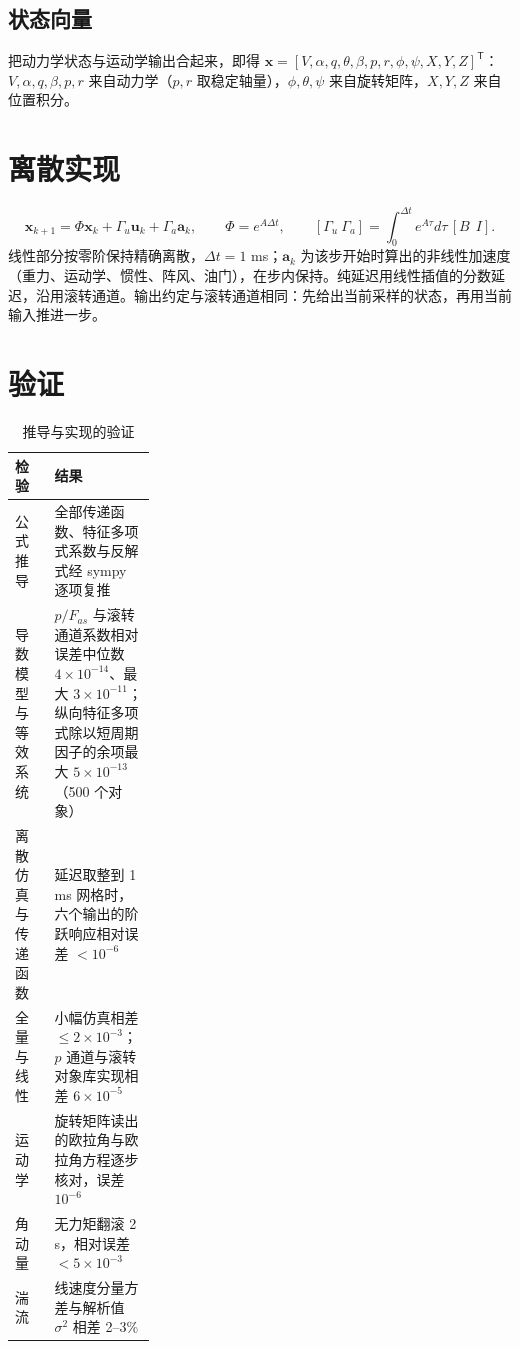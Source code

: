 \documentclass[UTF8,a4paper,11pt,fontset=fandol,scheme=plain]{ctexart}
\begin{document}
\subsection{状态向量}
把动力学状态与运动学输出合起来，即得 \(\mathbf x=[V,\alpha,q,\theta,\beta,p,r,\phi,\psi,X,Y,Z]^{\mathsf T}\)：\(V,\alpha,q,\beta,p,r\) 来自动力学（\(p,r\) 取稳定轴量），\(\phi,\theta,\psi\) 来自旋转矩阵，\(X,Y,Z\) 来自位置积分。

\section{离散实现}
\begin{equation}
\mathbf x_{k+1}=\Phi\mathbf x_k+\Gamma_u\mathbf u_k+\Gamma_a\mathbf a_k,\qquad \Phi=e^{A\Delta t},\qquad [\Gamma_u\ \Gamma_a]=\int_0^{\Delta t}e^{A\tau}d\tau\,[B\ \ I].
\end{equation}
线性部分按零阶保持精确离散，\(\Delta t=1\) ms；\(\mathbf a_k\) 为该步开始时算出的非线性加速度（重力、运动学、惯性、阵风、油门），在步内保持。纯延迟用线性插值的分数延迟，沿用滚转通道。输出约定与滚转通道相同：先给出当前采样的状态，再用当前输入推进一步。

\section{验证}
\begin{table}[H]
\centering\small
\caption{推导与实现的验证}\label{tab:check}
\begin{tabularx}{\linewidth}{@{}>{\raggedright\arraybackslash}p{0.28\linewidth}Y@{}}
\toprule
检验 & 结果 \\
\midrule
公式推导 & 全部传递函数、特征多项式系数与反解式经 sympy 逐项复推 \\
导数模型与等效系统 & \(p/F_{as}\) 与滚转通道系数相对误差中位数 \(4\times10^{-14}\)、最大 \(3\times10^{-11}\)；纵向特征多项式除以短周期因子的余项最大 \(5\times10^{-13}\)（500 个对象） \\
离散仿真与传递函数 & 延迟取整到 1 ms 网格时，六个输出的阶跃响应相对误差 \(<10^{-6}\) \\
全量与线性 & 小幅仿真相差 \(\le2\times10^{-3}\)；\(p\) 通道与滚转对象库实现相差 \(6\times10^{-5}\) \\
运动学 & 旋转矩阵读出的欧拉角与欧拉角方程逐步核对，误差 \(10^{-6}\) \\
角动量 & 无力矩翻滚 2 s，相对误差 \(<5\times10^{-3}\) \\
湍流 & 线速度分量方差与解析值 \(\sigma^2\) 相差 2–3\% \\
\bottomrule
\end{tabularx}
\end{table}
\end{document}
